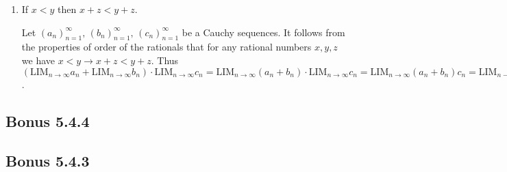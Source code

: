 \documentclass{article}
\theoremstyle{plain}
\theoremstyle{definition}
\begin{document}
\begin{enumerate}
	\item If \(x<y\) then \(x+z<y+z\).
		\begin{IEEEproof}
			Let \((a_n)_{n=1}^{\infty},\,(b_n)_{n=1}^{\infty},\,(c_n)_{n=1}^{\infty}\) be a Cauchy sequences. It follows from the properties of order of the rationals that for any rational numbers \(x,y,z\) we have \(x<y\rightarrow x+z<y+z\). Thus \((\text{LIM}_{n\rightarrow\infty}a_n+\text{LIM}_{n\rightarrow\infty}b_n)\cdot\text{LIM}_{n\rightarrow\infty}c_n=\text{LIM}_{n\rightarrow\infty}(a_n+b_n)\cdot\text{LIM}_{n\rightarrow\infty}c_n=\text{LIM}_{n\rightarrow\infty}(a_n+b_n)c_n=\text{LIM}_{n\rightarrow\infty}(a_nc_n+b_nc_n)=\text{LIM}_{n\rightarrow\infty}a_nc_n+\text{LIM}_{n\rightarrow\infty}b_nc_n\).
		\end{IEEEproof}
\end{enumerate}
\subsection*{Bonus 5.4.4}
\subsection*{Bonus 5.4.3}
\end{document}
